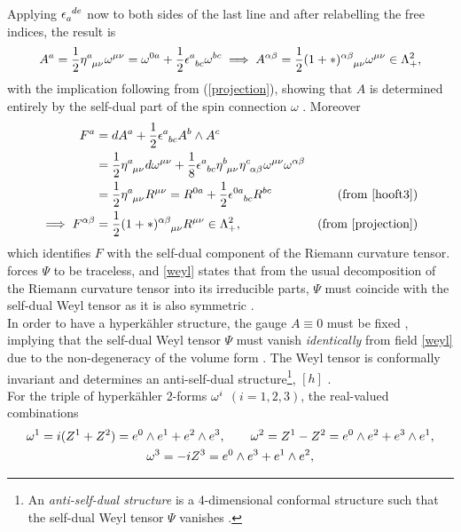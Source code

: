 \documentclass[a4paper,12pt, onecolumn, notitlepage]{article}
\theoremstyle{definition}
\theoremstyle{remark}
\newcommand{\al}{\alpha}
\newcommand{\w}{\omega}
\newcommand{\m}{\mu}
\newcommand{\n}{\nu}
\newcommand{\e}{\epsilon}
\newcommand{\HK}{hyperk\"ahler }
\newcommand{\hooft}[3]{\eta\indices{^{#1}_{#2}_{#3}}}
\begin{document}
Applying $\e\indices{_a^d^e}$ now to both sides of the last line and after relabelling the free indices, the result is
\begin{align*}
	A\indices{^a}=\frac{1}{2}\hooft{a}{\m}{\n}\w\indices{^\m^\n} = \w\indices{^0^a} + \frac{1}{2} \e\indices{^a_b_c}\w\indices{^b^c}
	\implies A^{\al\beta} = \frac{1}{2}(1+\ast)\indices{^\al^\beta_\m_\n}\w\indices{^\m^\n}\in\Lambda^{2}_{+},
\end{align*}
with the implication following from (\ref{projection}), showing that $A$ is determined entirely by the self-dual part of the spin connection $\w$ \cite{capovilla_1989}. Moreover
\begin{align*}
	F\indices{^a} &= dA\indices{^a} + \frac{1}{2}\e\indices{^a_b_c}A\indices{^b}\wedge A\indices{^c}\\
	&=\frac{1}{2}\hooft{a}{\m}{\n}d\w\indices{^\m^\n}+\frac{1}{8}\e\indices{^a_b_c}\hooft{b}{\m}{\n}\hooft{c}{\al}{\beta}\w\indices{^\m^\n} \w\indices{^\al^\beta}\\
	&=\frac{1}{2}\hooft{a}{\m}{\n}R\indices{^\m^\n}= R^{0a}+\frac{1}{2}\e\indices{^0^a_b_c}R^{bc}&(\text{from \ref{hooft3})}\\
	\implies F\indices{^\al^\beta} &= \frac{1}{2}(1+\ast)\indices{^\al^\beta_\m_\n}R\indices{^\m^\n}\in\Lambda^{2}_{+},&(\text{from \ref{projection})}
\end{align*}
which identifies $F$ with the self-dual component of the Riemann curvature tensor.  forces $\Psi$ to be traceless, and \cref{weyl} states that from the usual decomposition of the Riemann curvature tensor into its irreducible parts, $\Psi$ must coincide with the self-dual Weyl tensor as it is also symmetric \cite{capovilla_1993}.\\	
In order to have a \HK structure, the gauge $A\equiv0$ must be fixed \cite{capovilla_1991}, implying that the self-dual Weyl tensor $\Psi$ must vanish \emph{identically} from field \cref{weyl} due to the non-degeneracy of the volume form \cite{capovilla_1993}. The Weyl tensor is conformally invariant and determines an anti-self-dual structure\footnote{An \emph{anti-self-dual structure} is a 4-dimensional conformal structure such that the self-dual Weyl tensor $\Psi$ vanishes \cite{solitons}.}, $[h]$ \cite{solitons}.\\
For the triple of \HK 2-forms $\w\indices{^i}$ $(i=1,2,3)$, the real-valued combinations
\begin{gather*}
\w\indices{^1} = i(Z^{1}+Z^{2}) = e^{0}\wedge e^{1}+e^{2}\wedge e^{3},\qquad \w\indices{^2}= Z^{1}-Z^{2}=e^{0}\wedge e^{2}+e^{3}\wedge e^{1},\\\w\indices{^3} = -iZ\indices{^3}=e^{0}\wedge e^{3}+e^{1}\wedge e^{2},
\end{gather*}
\end{document}
